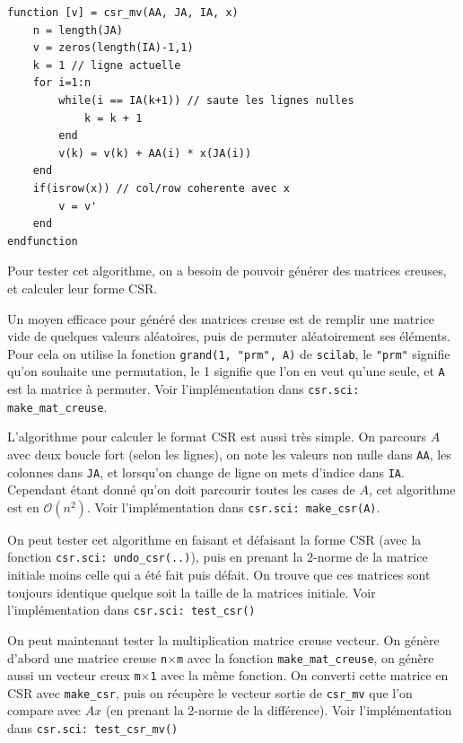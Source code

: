 \documentclass{article}
\begin{document}
\begin{scriptsize}
\centering
\begin{verbatim}
function [v] = csr_mv(AA, JA, IA, x)
    n = length(JA)
    v = zeros(length(IA)-1,1)
    k = 1 // ligne actuelle
    for i=1:n
        while(i == IA(k+1)) // saute les lignes nulles
            k = k + 1
        end
        v(k) = v(k) + AA(i) * x(JA(i))
    end
    if(isrow(x)) // col/row coherente avec x
        v = v'
    end
endfunction
\end{verbatim}
\end{scriptsize}

Pour tester cet algorithme, on a besoin de pouvoir générer des matrices creuses, et calculer leur forme CSR.

Un moyen efficace pour généré des matrices creuse est de remplir une matrice vide de quelques valeurs aléatoires, puis de permuter aléatoirement ses éléments. Pour cela on utilise la fonction \texttt{grand(1, "prm", A)} de \texttt{scilab}, le \texttt{"prm"} signifie qu'on souhaite une permutation, le 1 signifie que l'on en veut qu'une seule, et \texttt{A} est la matrice à permuter. Voir l'implémentation dans \texttt{csr.sci: make\_mat\_creuse}.
\newline\indent

L'algorithme pour calculer le format CSR est aussi très simple. On parcours \(A\) avec deux boucle fort (selon les lignes), on note les valeurs non nulle dans \texttt{AA}, les colonnes dans \texttt{JA}, et lorsqu'on change de ligne on mets d'indice dans \texttt{IA}. Cependant étant donné qu'on doit parcourir toutes les cases de \(A\), cet algorithme est en \(\mathcal{O}(n^2)\). Voir l'implémentation dans \texttt{csr.sci: make\_csr(A)}.

On peut tester cet algorithme en faisant et défaisant la forme CSR (avec la fonction \texttt{csr.sci: undo\_csr(..)}), puis en prenant la 2-norme de la matrice initiale moins celle qui a été fait puis défait. On trouve que ces matrices sont toujours identique quelque soit la taille de la matrices initiale. Voir l'implémentation dans \texttt{csr.sci: test\_csr()}
\newline\indent

On peut maintenant tester la multiplication matrice creuse vecteur. On génère d'abord une matrice creuse \texttt{n}\(\times\)\texttt{m} avec la fonction \texttt{make\_mat\_creuse}, on génère aussi un vecteur creux \texttt{m}\(\times\)\texttt{1} avec la même fonction. On converti cette matrice en CSR avec \texttt{make\_csr}, puis on récupère le vecteur sortie de \texttt{csr\_mv} que l'on compare avec \(Ax\) (en prenant la 2-norme de la différence). Voir l'implémentation dans \texttt{csr.sci: test\_csr\_mv()}
\end{document}
